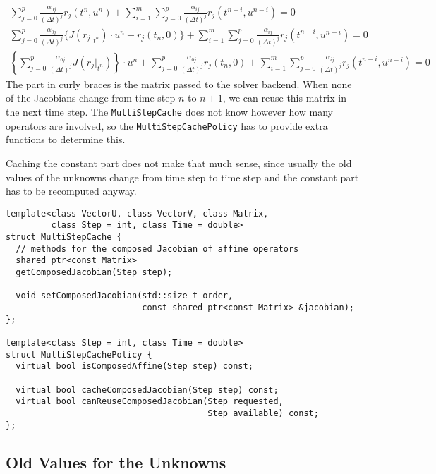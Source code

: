 \documentclass[11pt,a4paper,DIV11,%
notitlepage,oneside,abstracton,%
bibtotoc]{scrartcl}
\begin{document}
\begin{gather}
  \sum_{j=0}^p\frac{\alpha_{0j}}{(\Delta t)^j}r_j(t^n,u^n)+
    \sum_{i=1}^m\sum_{j=0}^p\frac{\alpha_{ij}}{(\Delta t)^j}
             r_j(t^{n-i},u^{n-i})=0 \\
  \sum_{j=0}^p\frac{\alpha_{0j}}{(\Delta t)^j}
             \{J(r_j|_{t^n})\cdot u^n+r_j(t_n,0)\}+
    \sum_{i=1}^m\sum_{j=0}^p\frac{\alpha_{ij}}{(\Delta t)^j}
             r_j(t^{n-i},u^{n-i})=0 \\
  \left\{\sum_{j=0}^p\frac{\alpha_{0j}}{(\Delta t)^j}
             J(r_j|_{t^n})\right\}\cdot u^n+
    \sum_{j=0}^p\frac{\alpha_{0j}}{(\Delta t)^j}r_j(t_n,0)+
    \sum_{i=1}^m\sum_{j=0}^p\frac{\alpha_{ij}}{(\Delta t)^j}
             r_j(t^{n-i},u^{n-i})=0
\end{gather}
The part in curly braces is the matrix passed to the solver backend.  When
none of the Jacobians change from time step $n$ to $n+1$, we can reuse this
matrix in the next time step.  The {\tt MultiStepCache} does not know however
how many operators are involved, so the {\tt MultiStepCachePolicy} has to
provide extra functions to determine this.

Caching the constant part does not make that much sense, since usually the old
values of the unknowns change from time step to time step and the constant
part has to be recomputed anyway.
\begin{lstlisting}
template<class VectorU, class VectorV, class Matrix,
         class Step = int, class Time = double>
struct MultiStepCache {
  // methods for the composed Jacobian of affine operators
  shared_ptr<const Matrix>
  getComposedJacobian(Step step);

  void setComposedJacobian(std::size_t order,
                           const shared_ptr<const Matrix> &jacobian);
};

template<class Step = int, class Time = double>
struct MultiStepCachePolicy {
  virtual bool isComposedAffine(Step step) const;

  virtual bool cacheComposedJacobian(Step step) const;
  virtual bool canReuseComposedJacobian(Step requested,
                                        Step available) const;
};
\end{lstlisting}

\subsection{Old Values for the Unknowns}
\end{document}
